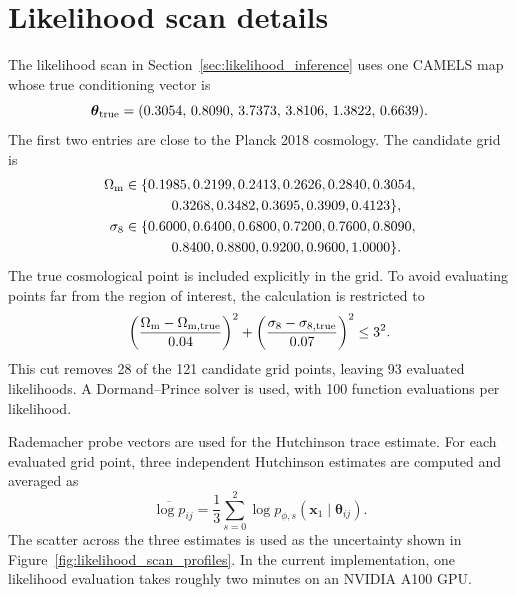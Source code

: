 \documentclass[usenatbib]{mnras}
\newcommand{\Om}{\Omega_{\rm m}}
\newcommand{\sig}{\sigma_8}
\newcommand{\thetavec}{\boldsymbol{\theta}}
\begin{document}
\section{Likelihood scan details}
\label{app:likelihood_scan}

The likelihood scan in Section~\ref{sec:likelihood_inference} uses one
CAMELS map whose true conditioning vector is
\begin{equation}
  \thetavec_{\rm true}
  =
  (0.3054,\,0.8090,\,3.7373,\,3.8106,\,1.3822,\,0.6639).
  \label{eq:scan_true_params}
\end{equation}
The first two entries are close to the Planck 2018 cosmology. The
candidate grid is
\begin{align}
  \Om &\in
  \{0.1985,0.2199,0.2413,0.2626,0.2840,0.3054,\nonumber\\
      &\hspace{1.2cm}
        0.3268,0.3482,0.3695,0.3909,0.4123\},\\
  \sig &\in
  \{0.6000,0.6400,0.6800,0.7200,0.7600,0.8090,\nonumber\\
       &\hspace{1.2cm}
         0.8400,0.8800,0.9200,0.9600,1.0000\}.
\end{align}
The true cosmological point is included explicitly in the grid. To
avoid evaluating points far from the region of interest, the calculation
is restricted to
\begin{equation}
  \left(
  \frac{\Om-\Omega_{{\rm m},{\rm true}}}{0.04}
  \right)^2
  +
  \left(
  \frac{\sig-\sigma_{8,{\rm true}}}{0.07}
  \right)^2
  \leq 3^2 .
  \label{eq:scan_ellipse}
\end{equation}
This cut removes 28 of the 121 candidate grid points, leaving 93
evaluated likelihoods. A Dormand--Prince solver is used, with 100
function evaluations per likelihood.

Rademacher probe vectors are used for the Hutchinson trace estimate.
For each evaluated grid point, three independent Hutchinson estimates
are computed and averaged as
\begin{equation}
  \overline{\log p}_{ij}
  =
  \frac{1}{3}
  \sum_{s=0}^{2}
  \log p_{\phi,s}
  (\mathbf{x}_1\mid\thetavec_{ij}).
  \label{eq:hutchinson_mean}
\end{equation}
The scatter across the three estimates is used as the uncertainty shown
in Figure~\ref{fig:likelihood_scan_profiles}. In the current
implementation, one likelihood evaluation takes roughly two minutes on
an NVIDIA A100 GPU.
\end{document}
